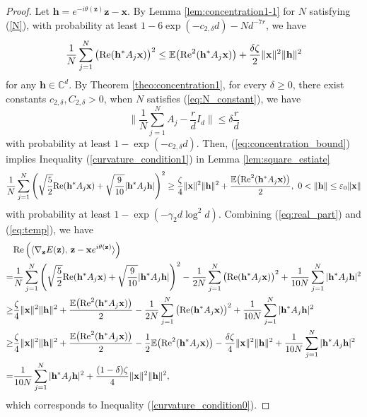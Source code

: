 \documentclass{article}
\renewcommand{\eqref}[1]{(\ref{#1})}
\newcommand{\C}{{\mathbb C}}
\newcommand{\E}{{\mathbb E}}
\newcommand{\re}{{\rm Re}}
\newcommand{\vx}{{\mathbf x}}
\newcommand{\vz}{{\mathbf z}}
\newcommand{\vh}{{\mathbf h}}
\newcommand{\0}{{\mathbf 0}}
\numberwithin{equation}{section}
\begin{document}
	\begin{proof} 
		Let $\vh=e^{-i\theta(\vz)}\vz-\vx$. 
		By Lemma \ref{lem:concentration1-1}  for $ N $ satisfying \eqref{N}, with probability at least $1-6\exp(-c_{2,\delta} d)-Nd^{-7r}$, we have
		\begin{equation}
			\label{eq:real_part}
			\frac{1}{N}\sum^N_{j=1}\big(\re(\vh^*A_j\vx)\big)^2
			\le \E\big(\re^2(\vh^*A_j\vx)\big)+\frac{\delta\zeta}{2}\|\vx\|^2\|\vh\|^2
		\end{equation}
		for any $ \vh\in\C^d $. By Theorem \ref{theo:concentration1}, for every $\delta\ge0$, there exist constants $c_{2,\delta},C_{2,\delta}>0$, when $N$ satisfies \eqref{eq:N_constant}, we have 
		\begin{equation}\label{eq:concentration_bound}
			\Big\|\frac1N\sum_{j=1}^N A_j-\frac rd I_d\Big\|\le \delta\frac rd 
		\end{equation}
		with probability at least $1-\exp(-c_{2,\delta}d)$. Then, \eqref{eq:concentration_bound} implies Inequality \eqref{curvature_condition1} in Lemma \ref{lem:square_estiate} 
		\begin{equation}\label{eq:temp}
			\frac{1}{N}\sum^N_{j=1}\Bigg( \sqrt{\frac{5}{2}}\re(\vh^*A_j\vx)+\sqrt{\frac{9}{10}}|\vh^*A_j\vh|\Bigg)^2\ge\frac{\zeta}{4}\|\vx\|^2\|\vh\|^2+\frac{ \E\big(\re^2(\vh^*A_j\vx)\big)}{2},\ 0< \|\vh\|\le\varepsilon_0\|\vx\|
		\end{equation}
		with probability at least $1-\exp(-\gamma_2 d\log^2d)$. Combining \eqref{eq:real_part} and \eqref{eq:temp}, we have
		\begin{align*}
			&\re\left(\langle\nabla_{\vz} E(\vz),\,\vz-\vx e^{i\theta(\vz)}\rangle\right)\\
			=&\frac{1}{N}\sum^N_{j=1}\Bigg( \sqrt{\frac{5}{2}}\re(\vh^*A_j\vx)+\sqrt{\frac{9}{10}}|\vh^*A_j\vh|\Bigg)^2-\frac{1}{2N}\sum^N_{j=1}\big(\re(\vh^*A_j\vx)\big)^2+\frac{1}{10N}\sum^N_{j=1}|\vh^*A_j\vh|^2\\
			\ge&\frac{\zeta}{4}\|\vx\|^2\|\vh\|^2+\frac{ \E\big(\re^2(\vh^*A_j\vx)\big)}{2}-\frac{1}{2N}\sum^N_{j=1}\big(\re(\vh^*A_j\vx)\big)^2+\frac{1}{10N}\sum^N_{j=1}|\vh^*A_j\vh|^2\\
			\ge&\frac{\zeta}{4}\|\vx\|^2\|\vh\|^2+\frac{ \E\big(\re^2(\vh^*A_j\vx)\big)}{2}-\frac12\E\big(\re^2(\vh^*A_j\vx)\big)-\frac{\delta\zeta}{4}\|\vx\|^2\|\vh\|^2+\frac{1}{10N}\sum^N_{j=1}|\vh^*A_j\vh|^2\\
			=&\frac{1}{10N}\sum^N_{j=1}|\vh^*A_j\vh|^2+\frac{(1-\delta)\zeta}{4}\|\vx\|^2\|\vh\|^2,
		\end{align*}
		which corresponds to Inequality \eqref{curvature_condition0}.
		

\end{proof}
\end{document}
